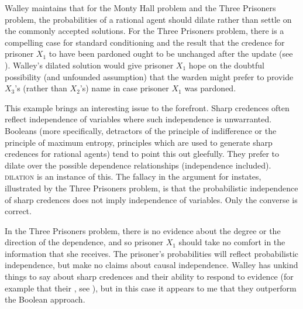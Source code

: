 \documentclass[11pt]{article}
\begin{document}

Walley maintains that for the Monty Hall problem and the Three
Prisoners problem, the probabilities of a rational agent should dilate
rather than settle on the commonly accepted solutions. For the Three
Prisoners problem, there is a compelling case for standard
conditioning and the result that the credence for prisoner $X_{1}$ to
have been pardoned ought to be unchanged after the update (see
). Walley's dilated solution would give
prisoner $X_{1}$ hope on the doubtful possibility (and unfounded
assumption) that the warden might prefer to provide $X_{3}$'s (rather
than $X_{2}$'s) name in case prisoner $X_{1}$ was pardoned.

This example brings an interesting issue to the forefront. Sharp
credences often reflect independence of variables where such
independence is unwarranted. Booleans (more specifically, detractors
of the principle of indifference or the principle of maximum entropy,
principles which are used to generate sharp credences for rational
agents) tend to point this out gleefully. They prefer to dilate over
the possible dependence relationships (independence included).
\textsc{dilation} is an instance of this. The fallacy in the argument
for instates, illustrated by the Three Prisoners problem, is that the
probabilistic independence of sharp credences does not imply
independence of variables. Only the converse is correct.

In the Three Prisoners problem, there is no evidence about the degree
or the direction of the dependence, and so prisoner $X_{1}$ should
take no comfort in the information that she receives. The prisoner's
probabilities will reflect probabilistic independence, but make no
claims about causal independence. Walley has unkind things to say
about sharp credences and their ability to respond to evidence (for
example that their , see
), but in this case it appears to me that they
outperform the Boolean approach.
\end{document}
